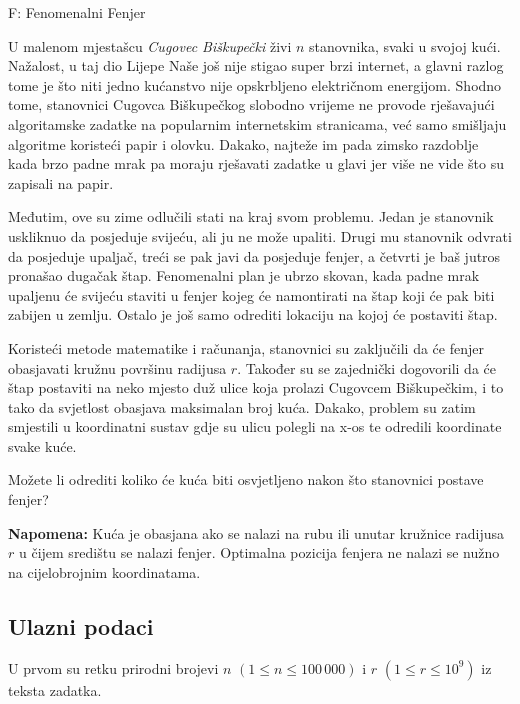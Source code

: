 \begin{statement}[
  timelimit=1 s,
  memorylimit=512 MiB,
]{F: Fenomenalni Fenjer}

U malenom mjestašcu \textit{Cugovec Biškupečki} živi $n$ stanovnika, svaki u
svojoj kući. Nažalost, u taj dio Lijepe Naše još nije stigao super brzi
internet, a glavni razlog tome je što niti jedno kućanstvo nije opskrbljeno
električnom energijom. Shodno tome, stanovnici Cugovca Biškupečkog slobodno
vrijeme ne provode rješavajući algoritamske zadatke na popularnim
internetskim stranicama, već samo smišljaju algoritme koristeći papir i
olovku. Dakako, najteže im pada zimsko razdoblje kada brzo padne mrak pa
moraju rješavati zadatke u glavi jer više ne vide što su zapisali na papir.

Međutim, ove su zime odlučili stati na kraj svom problemu. Jedan je stanovnik
uskliknuo da posjeduje svijeću, ali ju ne može upaliti. Drugi mu stanovnik
odvrati da posjeduje upaljač, treći se pak javi da posjeduje fenjer, a
četvrti je baš jutros pronašao dugačak štap. Fenomenalni plan je ubrzo
skovan, kada padne mrak upaljenu će svijeću staviti u fenjer kojeg će
namontirati na štap koji će pak biti zabijen u zemlju. Ostalo je još samo
odrediti lokaciju na kojoj će postaviti štap.

Koristeći metode matematike i računanja, stanovnici su zaključili da će fenjer
obasjavati kružnu površinu radijusa $r$. Također su se zajednički dogovorili
da će štap postaviti na neko mjesto duž ulice koja prolazi Cugovcem
Biškupečkim, i to tako da svjetlost obasjava maksimalan broj kuća. Dakako,
problem su zatim smjestili u koordinatni sustav gdje su ulicu polegli na x-os
te odredili koordinate svake kuće.

Možete li odrediti koliko će kuća biti osvjetljeno nakon što stanovnici postave
fenjer?

\textbf{Napomena:} Kuća je obasjana ako se nalazi na rubu ili unutar kružnice
radijusa $r$ u čijem središtu se nalazi fenjer. Optimalna pozicija fenjera ne
nalazi se nužno na cijelobrojnim koordinatama.

\subsection*{Ulazni podaci}
U prvom su retku prirodni brojevi $n$ $(1 \le n \le 100\,000)$ i $r$
$(1 \le r \le 10^9)$ iz teksta zadatka.


\end{statement}
